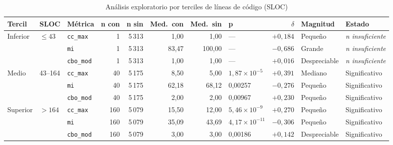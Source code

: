\begin{table}[t]
\centering
\scriptsize
\setlength{\tabcolsep}{3.5pt}
\caption{Análisis exploratorio por terciles de líneas de código (SLOC)}
\label{tab:terciles}
\begin{tabularx}{\textwidth}{@{}l l l r r r r l r l >{\raggedright\arraybackslash}X@{}}
\toprule
\textbf{Tercil} & \textbf{SLOC} & \textbf{Métrica} & \textbf{n con} & \textbf{n sin} & \textbf{Med.\ con} & \textbf{Med.\ sin} & \textbf{p} & \textbf{$\delta$} & \textbf{Magnitud} & \textbf{Estado} \\
\midrule
Inferior & $\leq 43$ & \texttt{cc\_max} & 1 & 5\,313 & 1,00 & 1,00 & --- & $+0{,}184$ & Pequeño & \textit{n insuficiente} \\
 &  & \texttt{mi} & 1 & 5\,313 & 83,47 & 100,00 & --- & $-0{,}686$ & Grande & \textit{n insuficiente} \\
 &  & \texttt{cbo\_mod} & 1 & 5\,313 & 1,00 & 1,00 & --- & $+0{,}016$ & Despreciable & \textit{n insuficiente} \\
\midrule
Medio & 43--164 & \texttt{cc\_max} & 40 & 5\,175 & 8,50 & 5,00 & $1{,}87 \times 10^{-5}$ & $+0{,}391$ & Mediano & Significativo \\
 &  & \texttt{mi} & 40 & 5\,175 & 62,18 & 68,12 & 0,00257 & $-0{,}276$ & Pequeño & Significativo \\
 &  & \texttt{cbo\_mod} & 40 & 5\,175 & 2,00 & 2,00 & 0,00967 & $+0{,}230$ & Pequeño & Significativo \\
\midrule
Superior & $>164$ & \texttt{cc\_max} & 160 & 5\,079 & 15,50 & 12,00 & $5{,}46 \times 10^{-9}$ & $+0{,}270$ & Pequeño & Significativo \\
 &  & \texttt{mi} & 160 & 5\,079 & 35,09 & 43,69 & $4{,}17 \times 10^{-11}$ & $-0{,}306$ & Pequeño & Significativo \\
 &  & \texttt{cbo\_mod} & 160 & 5\,079 & 3,00 & 3,00 & 0,00186 & $+0{,}142$ & Despreciable & Significativo \\
\bottomrule
\end{tabularx}
\end{table}